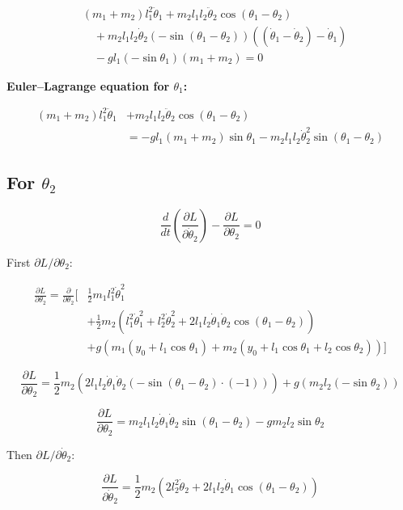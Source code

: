 \documentclass[11pt,a4paper]{article}
\begin{document}
\begin{align*}
& (m_1 + m_2) l_1^2 \ddot{\theta}_1 + m_2 l_1 l_2 \ddot{\theta}_2 \cos(\theta_1 - \theta_2) \\
&\quad + m_2 l_1 l_2 \dot{\theta}_2 (-\sin(\theta_1 - \theta_2)) \left( (\dot{\theta}_1 - \dot{\theta}_2) - \dot{\theta}_1 \right) \\
&\quad - g l_1 (-\sin\theta_1) (m_1 + m_2) = 0
\end{align*}

\textbf{Euler--Lagrange equation for $\theta_1$:}

\begin{align*}
(m_1 + m_2) l_1^2 \ddot{\theta}_1 &+ m_2 l_1 l_2 \ddot{\theta}_2 \cos(\theta_1 - \theta_2) \\
  &= -g l_1 (m_1 + m_2) \sin\theta_1 - m_2 l_1 l_2 \dot{\theta}_2^2 \sin(\theta_1 - \theta_2)
\end{align*}

\subsection{For $\theta_2$}

\[ \frac{d}{dt} \left( \frac{\partial L}{\partial \dot{\theta}_2} \right) - \frac{\partial L}{\partial \theta_2} = 0 \]

First $\partial L / \partial \theta_2$:

\begin{align*}
\frac{\partial L}{\partial \theta_2} = \frac{\partial}{\partial \theta_2} \Big[
  &\frac{1}{2} m_1 l_1^2 \dot{\theta}_1^2 \\
  &+ \frac{1}{2} m_2 \left( l_1^2 \dot{\theta}_1^2 + l_2^2 \dot{\theta}_2^2 + 2 l_1 l_2 \dot{\theta}_1 \dot{\theta}_2 \cos(\theta_1 - \theta_2) \right) \\
  &+ g \left( m_1 (y_0 + l_1 \cos\theta_1) + m_2 (y_0 + l_1 \cos\theta_1 + l_2 \cos\theta_2) \right) \Big]
\end{align*}

\[ \frac{\partial L}{\partial \theta_2} = \frac{1}{2} m_2 \left( 2 l_1 l_2 \dot{\theta}_1 \dot{\theta}_2 (-\sin(\theta_1 - \theta_2) \cdot (-1)) \right) + g \left( m_2 l_2 (-\sin\theta_2) \right) \]

\[ \frac{\partial L}{\partial \theta_2} = m_2 l_1 l_2 \dot{\theta}_1 \dot{\theta}_2 \sin(\theta_1 - \theta_2) - g m_2 l_2 \sin\theta_2 \]

Then $\partial L / \partial \dot{\theta}_2$:

\[ \frac{\partial L}{\partial \dot{\theta}_2} = \frac{1}{2} m_2 \left( 2 l_2^2 \dot{\theta}_2 + 2 l_1 l_2 \dot{\theta}_1 \cos(\theta_1 - \theta_2) \right) \]
\end{document}
